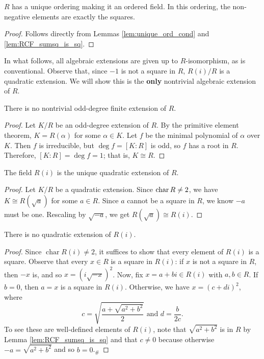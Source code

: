 \begin{lemma}
  \label{lem:RCF_ord_unique}
  \leanok
  $R$ has a unique ordering making it an ordered field. In this ordering, the non-negative elements are exactly the squares.
\end{lemma}
\begin{proof}
  \leanok
  Follows directly from Lemmas \ref{lem:unique_ord_cond} and \ref{lem:RCF_sumsq_is_sq}.
\end{proof}

In what follows, all algebraic extensions are given up to $R$-isomorphism, as is conventional. Observe that, since $-1$ is not a square in $R$, $R(i)/R$ is a quadratic extension. We will show this is the \textbf{only} nontrivial algebraic extension of $R$.

\begin{lemma}
  \label{lem:alg_ext_odd_deg}
  \leanok
  There is no nontrivial odd-degree finite extension of $R$.
\end{lemma}
\begin{proof}
  \leanok
  Let $K/R$ be an odd-degree extension of $R$. By the primitive element theorem, $K=R(\alpha)$ for some $\alpha\in K$. Let $f$ be the minimal polynomial of $\alpha$ over $K$. Then $f$ is irreducible, but $\deg f=[K:R]$ is odd, so $f$ has a root in $R$. Therefore, $[K:R]=\deg f=1$; that is, $K\cong R$.
\end{proof}

\begin{lemma}
  \label{lem:ext_deg_2}
  \leanok
  The field $R(i)$ is the unique quadratic extension of $R$.
\end{lemma}
\begin{proof}
  \leanok
  Let $K/R$ be a quadratic extension. Since $\operatorname{char} R\neq2$, we have $K\cong R(\sqrt{a})$ for some $a\in R$. Since $a$ cannot be a square in $R$, we know $-a$ must be one. Rescaling by $\sqrt{-a}$, we get $R(\sqrt{a})\cong R(i)$.
\end{proof}

\begin{lemma}
  \label{lem:Ri_ext_deg_2}
  \leanok
  There is no quadratic extension of $R(i)$.
\end{lemma}
\begin{proof}
  \leanok
  Since $\operatorname{char}R(i)\neq 2$, it suffices to show that every element of $R(i)$ is a square. Observe that every $x\in R$ is a square in $R(i)$: if $x$ is not a square in $R$, then $-x$ is, and so $x=(i\sqrt{-x})^2$. Now, fix $x=a+bi\in R(i)$ with $a,b\in R$. If $b=0$, then $a=x$ is a square in $R(i)$. Otherwise, we have $x=(c+di)^2$, where
  \[c=\sqrt{\frac{a+\sqrt{a^2+b^2}}{2}}\text{ and }d=\frac{b}{2c}.\]
  To see these are well-defined elements of $R(i)$, note that $\sqrt{a^2+b^2}$ is in $R$ by Lemma \ref{lem:RCF_sumsq_is_sq} and that $c\neq0$ because otherwise $-a=\sqrt{a^2+b^2}$ and so $b=0$.$_\#$
\end{proof}

